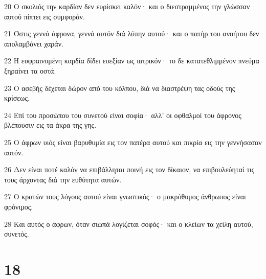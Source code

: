 \par 20 Ο σκολιός την καρδίαν δεν ευρίσκει καλόν· και ο διεστραμμένος την γλώσσαν αυτού πίπτει εις συμφοράν.
\par 21 Όστις γεννά άφρονα, γεννά αυτόν διά λύπην αυτού· και ο πατήρ του ανοήτου δεν απολαμβάνει χαράν.
\par 22 Η ευφραινομένη καρδία δίδει ευεξίαν ως ιατρικόν· το δε κατατεθλιμμένον πνεύμα ξηραίνει τα οστά.
\par 23 Ο ασεβής δέχεται δώρον από του κόλπου, διά να διαστρέψη τας οδούς της κρίσεως.
\par 24 Επί του προσώπου του συνετού είναι σοφία· αλλ' οι οφθαλμοί του άφρονος βλέπουσιν εις τα άκρα της γης.
\par 25 Ο άφρων υιός είναι βαρυθυμία εις τον πατέρα αυτού και πικρία εις την γεννήσασαν αυτόν.
\par 26 Δεν είναι ποτέ καλόν να επιβάλληται ποινή εις τον δίκαιον, να επιβουλεύηταί τις τους άρχοντας διά την ευθύτητα αυτών.
\par 27 Ο κρατών τους λόγους αυτού είναι γνωστικός· ο μακρόθυμος άνθρωπος είναι φρόνιμος.
\par 28 Και αυτός ο άφρων, όταν σιωπά λογίζεται σοφός· και ο κλείων τα χείλη αυτού, συνετός.

\chapter{18}

